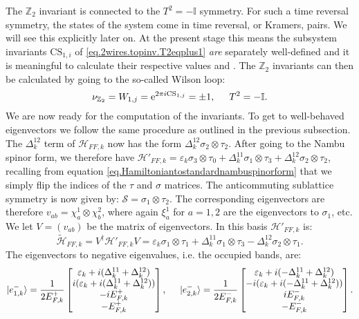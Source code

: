 The $\mathbb{Z}_2$ invariant is connected to the $T^2 = -\mathbb{I}$ symmetry. For such a time reversal symmetry, the states of the system come in time reversal, or Kramers, pairs. We will see this explicitly later on. At the present stage this means the subsystem invariants $\text{CS}_{1,i}$ of \eqref{eq.2wires.topinv.T2eqplus1} \textit{are} separately well-defined and it is meaningful to calculate their respective values \cite{FuKane2006, LiYangChen} and \cite[pp. 130-135]{BernevigTITSC}. The $\mathbb{Z}_2$ invariants can then be calculated by going to the so-called Wilson loop:
\begin{equation}
\nu_{\mathbb{Z}_2} = W_{1,j} = \text{e}^{2\pi i\text{CS}_{1,j}} = \pm 1, \hspace{0.5cm} T^2 = -\mathbb{I}.
\label{eq.2wires.topinv.T2eqminus1}
\end{equation}
We are now ready for the computation of the invariants. To get to well-behaved eigenvectors we follow the same procedure as outlined in the previous subsection. The $\Delta^{12}_k$ term of $\mathcal{H}_{FF,k}$ now has the form $\Delta^{12}_k \sigma_2 \otimes \tau_2$. After going to the Nambu spinor form, we therefore have $\mathcal{H}'_{FF,k} = \varepsilon_k \sigma_3 \otimes \tau_0 + \Delta^{11}_k \sigma_1 \otimes \tau_3 + \Delta^{12}_k \sigma_2 \otimes \tau_2$, recalling from equation \eqref{eq.Hamiltoniantostandardnambuspinorform} that we simply flip the indices of the $\tau$ and $\sigma$ matrices. The anticommuting sublattice symmetry is now given by: $\mathcal{S} = \sigma_1\otimes \tau_2$. The corresponding eigenvectors are therefore $v_{ab} = \chi^{1}_a\otimes\chi^{2}_b$, where again $\xi^{1}_a$ for $a = 1, 2$ are the eigenvectors to $\sigma_1$, etc. We let $V = (v_{ab})$ be the matrix of eigenvectors. In this basis $\mathcal{H}'_{FF,k}$ is:
\begin{equation}
\tilde{\mathcal{H}}_{FF,k} = V^\dagger\mathcal{H}'_{FF,k}V = \varepsilon_k \sigma_1\otimes \tau_1 + \Delta^{11}_k \sigma_1\otimes\tau_3 - \Delta^{12}_k\sigma_2\otimes\tau_1. \nonumber 
\end{equation}
The eigenvectors to negative eigenvalues, i.e. the occupied bands, are:
\begin{equation}
\ket{e^{-}_{1,k}} = \frac{1}{2E^{+}_{F,k}}\begin{bmatrix} \varepsilon_k + i(\Delta^{11}_k + \Delta^{12}_k) \\ i(\varepsilon_k + i(\Delta^{11}_k + \Delta^{12}_k)) \\ -iE^{+}_{F,k} \\ -E^{+}_{F,k} \end{bmatrix}, \hspace{0.5cm} \ket{e^{-}_{2,k}} = \frac{1}{2E^{-}_{F,k}}\begin{bmatrix} \varepsilon_k + i(-\Delta^{11}_k + \Delta^{12}_k) \\ -i(\varepsilon_k + i(-\Delta^{11}_k + \Delta^{12}_k)) \\ iE^{-}_{F,k} \\ -E^{-}_{F,k} \end{bmatrix}. \nonumber
\end{equation}

